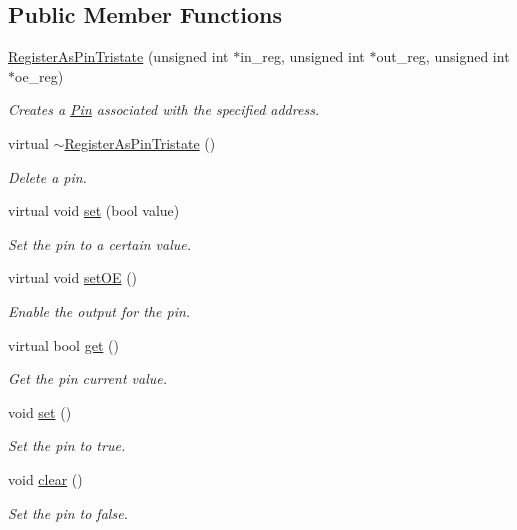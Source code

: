 \subsection*{Public Member Functions}
\begin{CompactItemize}
\item 
\hyperlink{classmprace_1_1RegisterAsPinTristate_a0}{Register\-As\-Pin\-Tristate} (unsigned int $\ast$in\_\-reg, unsigned int $\ast$out\_\-reg, unsigned int $\ast$oe\_\-reg)
\begin{CompactList}\small\item\em Creates a \hyperlink{classmprace_1_1Pin}{Pin} associated with the specified address. \item\end{CompactList}\item 
virtual \hyperlink{classmprace_1_1RegisterAsPinTristate_a1}{$\sim$Register\-As\-Pin\-Tristate} ()
\begin{CompactList}\small\item\em Delete a pin. \item\end{CompactList}\item 
virtual void \hyperlink{classmprace_1_1RegisterAsPinTristate_a2}{set} (bool value)
\begin{CompactList}\small\item\em Set the pin to a certain value. \item\end{CompactList}\item 
virtual void \hyperlink{classmprace_1_1RegisterAsPinTristate_a3}{set\-OE} ()
\begin{CompactList}\small\item\em Enable the output for the pin. \item\end{CompactList}\item 
virtual bool \hyperlink{classmprace_1_1RegisterAsPinTristate_a4}{get} ()
\begin{CompactList}\small\item\em Get the pin current value. \item\end{CompactList}\item 
void \hyperlink{classmprace_1_1RegisterAsPinTristate_a5}{set} ()
\begin{CompactList}\small\item\em Set the pin to true. \item\end{CompactList}\item 
void \hyperlink{classmprace_1_1RegisterAsPinTristate_a6}{clear} ()
\begin{CompactList}\small\item\em Set the pin to false. \item\end{CompactList}\end{CompactItemize}
